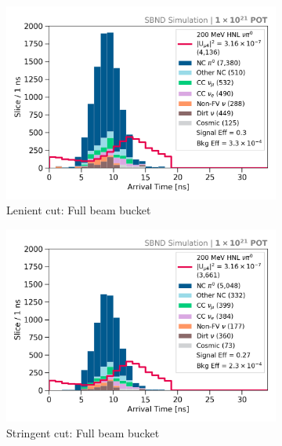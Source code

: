 \begin{figure}[htbp!]
	\hfill
	\begin{subfigure}[b]{0.495\textwidth}   
            \centering 
            \includegraphics[width=\textwidth]{bb_lenient_full}
            \caption{Lenient cut: Full beam bucket}%
	    \label{fig:bb_full_loose}
        \end{subfigure}
        \hfill
	\begin{subfigure}[b]{0.495\textwidth}   
            \centering 
            \includegraphics[width=\textwidth]{bb_stringent_full}
            \caption{Stringent cut: Full beam bucket}%
	    \label{fig:bb_full_strict}
        \end{subfigure}
	\hfill
        \begin{subfigure}[b]{0.495\textwidth}   

\end{subfigure}
\end{figure}

